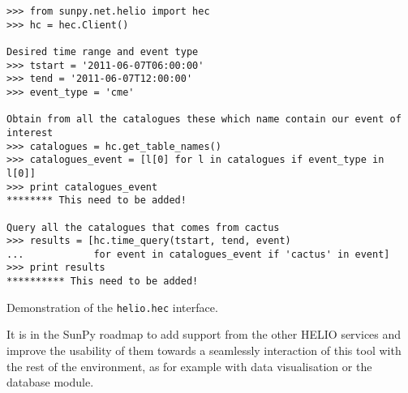 \begin{listing}[h]
\begin{verbatim}
>>> from sunpy.net.helio import hec
>>> hc = hec.Client()

Desired time range and event type
>>> tstart = '2011-06-07T06:00:00'
>>> tend = '2011-06-07T12:00:00'
>>> event_type = 'cme'

Obtain from all the catalogues these which name contain our event of interest
>>> catalogues = hc.get_table_names()
>>> catalogues_event = [l[0] for l in catalogues if event_type in l[0]]
>>> print catalogues_event
******** This need to be added!

Query all the catalogues that comes from cactus
>>> results = [hc.time_query(tstart, tend, event) 
...            for event in catalogues_event if 'cactus' in event]
>>> print results
********** This need to be added!
\end{verbatim}
\caption{Demonstration of the \texttt{helio.hec} interface.}
\label{code:helio}
\end{listing}

It is in the SunPy roadmap to add support from the other HELIO services and improve
the usability of them towards a seamlessly interaction of this tool with the rest of
the environment, as for example with data visualisation or the database module.
